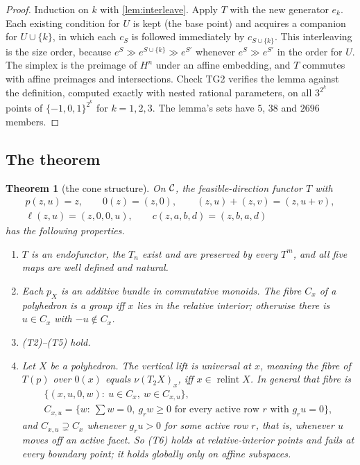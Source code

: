 \documentclass[11pt]{article}
\newtheorem{theorem}{Theorem}\newtheorem{proposition}[theorem]{Proposition}\newtheorem{lemma}[theorem]{Lemma}\newtheorem{corollary}[theorem]{Corollary}
\theoremstyle{definition}\newtheorem{definition}[theorem]{Definition}\newtheorem{remark}[theorem]{Remark}\newtheorem{example}[theorem]{Example}
\begin{document}
\begin{proof}
Induction on $k$ with \cref{lem:interleave}. Apply $T$ with the new generator $e_k$. Each existing condition for $U$ is kept (the base
point) and acquires a companion for $U\cup\{k\}$, in which each $c_S$ is followed immediately by $c_{S\cup\{k\}}$. This interleaving is
the size order, because $e^S\gg e^{S\cup\{k\}}\gg e^{S'}$ whenever $e^S\gg e^{S'}$ in the order for $U$. The simplex is the preimage of
$H^n$ under an affine embedding, and $T$ commutes with affine preimages and intersections. Check TG2 verifies the lemma against the
definition, computed exactly with nested rational parameters, on all $3^{2^k}$ points of $\{-1,0,1\}^{2^k}$ for $k=1,2,3$. The
lemma's sets have $5$, $38$ and $2696$ members.
\end{proof}

\subsection{The theorem}
\begin{theorem}[the cone structure]\label{thm:cone}
On $\mathcal C$, the feasible-direction functor $T$ with
\begin{gather*}
p(z,u)=z,\qquad 0(z)=(z,0),\qquad (z,u)+(z,v)=(z,u+v),\\
\ell(z,u)=(z,0,0,u),\qquad c(z,a,b,d)=(z,b,a,d)
\end{gather*}
has the following properties.
\begin{enumerate}
\item[(1)] $T$ is an endofunctor, the $T_n$ exist and are preserved by every $T^m$, and all five maps are well defined and natural.
\item[(2)] Each $p_X$ is an additive bundle in commutative monoids. The fibre $C_x$ of a polyhedron is a group iff $x$ lies in the
  relative interior; otherwise there is $u\in C_x$ with $-u\notin C_x$.
\item[(3)] (T2)--(T5) hold.
\item[(4)] Let $X$ be a polyhedron. The vertical lift is universal at $x$, meaning the fibre of $T(p)$ over $0(x)$ equals $\nu(T_2X)_x$,
  iff $x\in\operatorname{relint}X$. In general that fibre is
\begin{gather*}
\{(x,u,0,w):\ u\in C_x,\ w\in C_{x,u}\},\\
C_{x,u}=\{w:\ \textstyle\sum w=0,\ g_rw\ge0\text{ for every active row $r$ with }g_ru=0\},
\end{gather*}
  and $C_{x,u}\supsetneq C_x$ whenever $g_ru>0$ for some active row $r$, that is, whenever $u$ moves off an active facet. So (T6) holds
  at relative-interior points and fails at every boundary point; it holds globally only on affine subspaces.
\end{enumerate}
\end{theorem}
\end{document}
